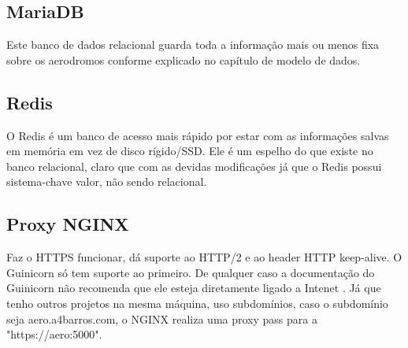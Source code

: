 \subsection{MariaDB}
Este banco de dados relacional guarda toda a informação mais ou menos fixa sobre os aerodromos
conforme explicado no capítulo de modelo de dados.

\subsection{Redis}
O Redis é um banco de acesso mais rápido por estar com as informações salvas em memória em vez
de disco rígido/SSD. Ele é um espelho do que existe no banco relacional, claro que com as devidas
modificações já que o Redis possui sistema-chave valor, não sendo relacional.

\subsection{Proxy NGINX}
Faz o HTTPS funcionar, dá suporte ao HTTP/2 e ao header HTTP keep-alive. O Guinicorn só tem suporte
ao primeiro. De qualquer caso a documentação do Guinicorn não recomenda que ele esteja diretamente
ligado a Intenet \cite{nginx-gunicorn}. Já que tenho outros projetos na mesma máquina, uso subdomínios, caso o subdomínio 
seja aero.a4barros.com, o NGINX realiza uma proxy pass para a "https://aero:5000".






